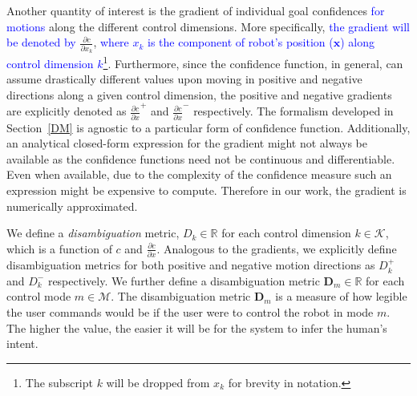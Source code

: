 \documentclass[conference]{IEEEtran}
\begin{document}
Another quantity of interest is the gradient of individual goal confidences \textcolor{blue}{for motions} along the different control dimensions. More specifically, \textcolor{blue}{the gradient will be denoted by} $\frac{\partial c}{\partial x_k}$, \textcolor{blue}{where $x_k$ is the component of robot's position ($\boldsymbol{x}$) along control dimension $k$\footnote{The subscript $k$ will be dropped from $x_k$ for brevity in notation.}}. Furthermore, since the confidence function, in general, can assume drastically different values upon moving in positive and negative directions along a  given control dimension, the positive and negative gradients are explicitly denoted as $\frac{\partial c}{\partial x}^{+}$ and $\frac{\partial c}{\partial x}^{-}$ respectively. The formalism developed in Section~\ref{DM} is agnostic to a particular form of confidence function. Additionally, an analytical closed-form expression for the gradient might not always be available as the confidence functions need not be continuous and differentiable. Even when available, due to the complexity of the confidence measure such an expression might be expensive to compute. Therefore in our work, the gradient is numerically approximated.

We define a \textit{disambiguation} metric, $D_{k}\in \mathbb{R}$ for each control dimension $k \in \mathcal{K}$, which is a function of $c$ and $\frac{\partial c}{\partial x}$. Analogous to the gradients, we explicitly define disambiguation metrics for both positive and negative motion directions as $D_{k}^{+}$ and $D_{k}^{-}$ respectively.
We further define a disambiguation metric $\boldsymbol{D}_m \in \mathbb{R}$ for each control mode $m \in \mathcal{M}$.
The disambiguation metric $\boldsymbol{D}_m$ is a measure of how legible the user commands would be if the user were to control the robot in mode $m$. The higher the value, the easier it will be for the system to infer the human's intent. 
\end{document}
